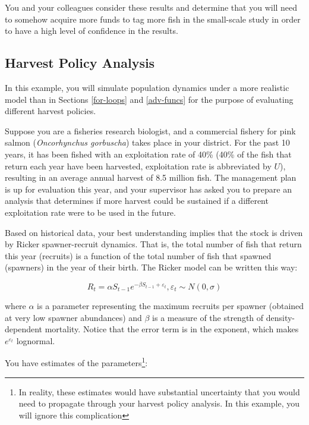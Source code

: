 \documentclass[]{book}
\let\rmarkdownfootnote\footnote%
\def\footnote{\protect\rmarkdownfootnote}
\begin{document}
You and your colleagues consider these results and determine that you will need to somehow acquire more funds to tag more fish in the small-scale study in order to have a high level of confidence in the results.

\hypertarget{harv-ex}{%
\subsection{Harvest Policy Analysis}\label{harv-ex}}

In this example, you will simulate population dynamics under a more realistic model than in Sections \ref{for-loops} and \ref{adv-funcs} for the purpose of evaluating different harvest policies.

Suppose you are a fisheries research biologist, and a commercial fishery for pink salmon (\emph{Oncorhynchus gorbuscha}) takes place in your district. For the past 10 years, it has been fished with an exploitation rate of 40\% (40\% of the fish that return each year have been harvested, exploitation rate is abbreviated by \(U\)), resulting in an average annual harvest of 8.5 million fish. The management plan is up for evaluation this year, and your supervisor has asked you to prepare an analysis that determines if more harvest could be sustained if a different exploitation rate were to be used in the future.

Based on historical data, your best understanding implies that the stock is driven by Ricker spawner-recruit dynamics. That is, the total number of fish that return this year (recruits) is a function of the total number of fish that spawned (spawners) in the year of their birth. The Ricker model can be written this way:

\begin{equation}
  R_t = \alpha S_{t-1} e^{-\beta S_{t-1} + \varepsilon_t} ,\varepsilon_t \sim N(0,\sigma)
\label{eq:ricker-ch4}
\end{equation}

where \(\alpha\) is a parameter representing the maximum recruits per spawner (obtained at very low spawner abundances) and \(\beta\) is a measure of the strength of density-dependent mortality. Notice that the error term is in the exponent, which makes \(e^{\varepsilon_t}\) lognormal.

You have estimates of the parameters\footnote{In reality, these estimates would have substantial uncertainty that you would need to propagate through your harvest policy analysis. In this example, you will ignore this complication}:
\end{document}
